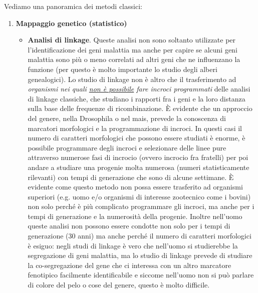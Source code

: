 \documentclass[11pt]{book}
\begin{document}
Vediamo una panoramica dei metodi classici:
\begin{enumerate} 
\item \textbf{Mappaggio genetico (statistico)}
\begin{itemize}
\item \textbf{Analisi di linkage}. Queste analisi non sono soltanto utilizzate per l’identificazione dei geni malattia ma anche per capire se alcuni geni malattia sono più o meno correlati ad altri geni che ne influenzano la funzione (per questo è molto importante lo studio degli alberi genealogici). Lo studio di linkage non è altro che il trasferimento ad \emph{organismi nei quali \underline{non è possibile} fare incroci programmati} delle analisi di linkage classiche, che studiano i rapporti fra i geni e la loro distanza sulla base delle frequenze di ricombinazione. È evidente che un approccio del genere, nella Drosophila o nel mais, prevede la conoscenza di marcatori morfologici e la programmazione di incroci. In questi casi il numero di caratteri morfologici che possono essere studiati è enorme, è possibile programmare degli incroci e selezionare delle linee pure attraverso numerose fasi di incrocio (ovvero incrocio fra fratelli) per poi andare a studiare una progenie molta numerosa (numeri statisticamente rilevanti) con tempi di generazione che sono di alcune settimane. È evidente come questo metodo non possa essere trasferito ad organismi superiori (e.g. uomo e/o organismi di interesse zootecnico come i bovini) non solo perché è più complicato programmare gli incroci, ma anche per i tempi di generazione e la numerosità della progenie. Inoltre nell’uomo queste analisi non possono essere condotte non solo per i tempi di generazione (30 anni) ma anche perché il numero di caratteri morfologici è esiguo: negli studi di linkage è vero che nell’uomo si studierebbe la segregazione di geni malattia, ma lo studio di linkage prevede di studiare la co-segregazione del gene che ci interessa con un altro marcatore fenotipico facilmente identificabile e siccome nell’uomo non si può parlare di colore del pelo o cose del genere, questo è molto difficile.
 

\end{itemize}
\end{enumerate}
\end{document}
